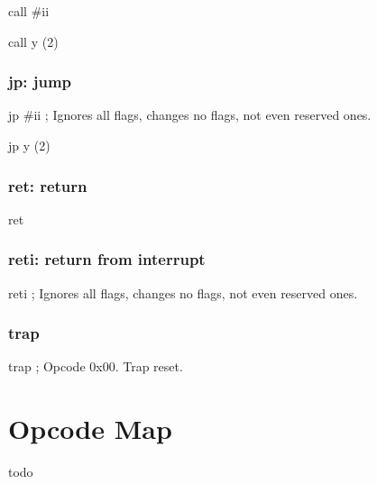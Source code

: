 \documentclass{book}
\begin{document}
call \#ii

call y (2)


\subsection{jp: jump}

jp \#ii     ; Ignores all flags, changes no flags, not even reserved ones.

jp y (2)


\subsection{ret: return}

ret


\subsection{reti: return from interrupt}

reti ; Ignores all flags, changes no flags, not even reserved ones.


\subsection{trap}

trap ; Opcode 0x00. Trap reset.

\chapter{Opcode Map}

todo
\end{document}
